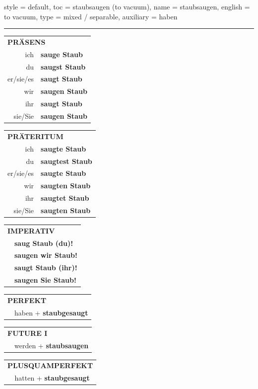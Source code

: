 \begin{verbentry}{
  style = {default},
  toc = {staubsaugen (to vacuum)},
  name = {staubsaugen},
  english = {to vacuum},
  type = {mixed / separable},
  auxiliary = {haben}
}
 

\vspace{5pt}
\hrule
\vspace{5pt}

\begin{tabular}{rl}
\multicolumn{2}{l}{\textbf{PRÄSENS}}\\
ich & \textbf{sauge Staub}\\
du & \textbf{saugst Staub}\\
er/sie/es & \textbf{saugt Staub}\\
wir & \textbf{saugen Staub}\\
ihr & \textbf{saugt Staub}\\
sie/Sie & \textbf{saugen Staub}\\
\end{tabular}
\hfill
\begin{tabular}{rl}
\multicolumn{2}{l}{\textbf{PRÄTERITUM}}\\
ich & \textbf{saugte Staub}\\
du & \textbf{saugtest Staub}\\
er/sie/es & \textbf{saugte Staub}\\
wir & \textbf{saugten Staub}\\
ihr & \textbf{saugtet Staub}\\
sie/Sie & \textbf{saugten Staub}\\
\end{tabular}
\hfill
\begin{tabular}{rl}
\multicolumn{2}{l}{\textbf{IMPERATIV}}\\
& \textbf{saug Staub (du)!}\\
& \textbf{saugen wir Staub!}\\
& \textbf{saugt Staub (ihr)!}\\
& \textbf{saugen Sie Staub!}\\
\end{tabular}

\vspace{10pt}

\begin{tabular}{rl}
\multicolumn{2}{l}{\textbf{PERFEKT}}\\
& haben + \textbf{staubgesaugt}\\
\end{tabular}
\hfill
\begin{tabular}{rl}
\multicolumn{2}{l}{\textbf{FUTURE I}}\\
& werden + \textbf{staubsaugen}\\
\end{tabular}
\hfill
\begin{tabular}{rl}
\multicolumn{2}{l}{\textbf{PLUSQUAMPERFEKT}}\\
& hatten + \textbf{staubgesaugt}\\
\end{tabular}


\end{verbentry}

